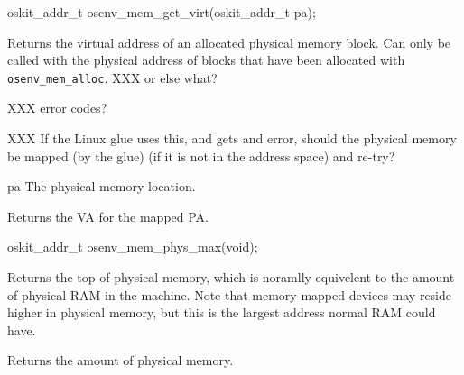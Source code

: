\begin{apisyn}
	\funcproto oskit_addr_t osenv_mem_get_virt(oskit_addr_t pa);
\end{apisyn}
\drvtoosn
\begin{apidesc}
	Returns the virtual address of an allocated physical memory block.
	Can only be called with the physical address of blocks that have been
	allocated with {\tt osenv_mem_alloc}.
	XXX or else what?

	XXX error codes?

	XXX If the Linux glue uses this, and gets and error,
	should the physical memory be mapped (by the glue)
	(if it is not in the address space) and re-try?

\end{apidesc}
\begin{apiparm}
	\item[pa]
		The physical memory location.
\end{apiparm}
\begin{apiret}
	Returns the VA for the mapped PA.
\end{apiret}


\begin{apisyn}
	\funcproto oskit_addr_t osenv_mem_phys_max(void);
\end{apisyn}
\drvtoosn
\begin{apidesc}
	Returns the top of physical memory, which is
	noramlly equivelent to the amount of physical
	RAM in the machine.
	Note that memory-mapped devices may reside higher in
	physical memory, but this is the largest address normal
	RAM could have.
\end{apidesc}
\begin{apiret}
	Returns the amount of physical memory.
\end{apiret}


